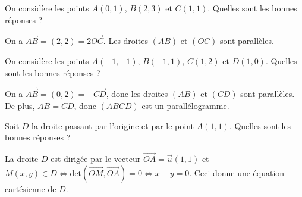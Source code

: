 \begin{question}

On considère les points $A(0,1)$, $B(2,3)$ et $C(1,1)$. Quelles sont les bonnes réponses ?
\begin{answers}  
\end{answers}
\begin{explanations}
On a $\overrightarrow{AB}=(2,2)=2\overrightarrow{OC}$. Les droites $(AB)$ et $(OC)$ sont parallèles.
\end{explanations}
\end{question}


\begin{question}

On considère les points $A(-1,-1)$, $B(-1,1)$, $C(1,2)$ et $D(1,0)$. Quelles sont les bonnes réponses ?
\begin{answers}  
\end{answers}
\begin{explanations}
On a $\overrightarrow{AB}=(0,2)=-\overrightarrow{CD}$, donc les droites $(AB)$ et $(CD)$ sont parallèles. De plus, $AB=CD$, donc $(ABCD)$ est un parallélogramme.
\end{explanations}
\end{question}


\begin{question}

Soit $D$ la droite passant par l'origine et par le point $A(1,1)$. Quelles sont les bonnes réponses ?
\begin{answers}  
\end{answers}
\begin{explanations}
La droite $D$ est dirigée par le vecteur $\overrightarrow{OA}=\vec{u}(1,1)$ et $M(x,y)\in D \Leftrightarrow \mbox{det}(\overrightarrow{OM},\overrightarrow{OA})=0\Leftrightarrow x-y=0$. Ceci donne une équation cartésienne de $D$.
\end{explanations}
\end{question}


